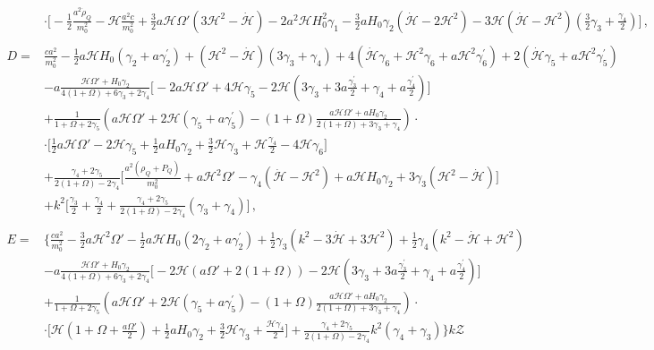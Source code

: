 \documentclass[prd,nofootinbib,showpacs]{revtex4}
\def\l{\left}
\def\r{\right}
\def\f{\frac}
\def\hub{{\mathcal H}}
\begin{document}
{\begin{align}
&\cdot\bigg[ -\f{1}{2}\f{a^2\dot{\rho}_Q}{m_0^2} -\hub\f{a^2c}{m_0^2} +\f{3}{2}a\hub\Omega'\l(3\hub^2 -\dot{\hub}\r) -2a^2\hub H_0^2\gamma_1 -\f{3}{2}aH_0\gamma_2\l(\dot{\hub}-2\hub^2\r) -3\hub\l(\dot{\hub}-\hub^2\r)\l(\f{3}{2}\gamma_3 + \f{\gamma_4}{2}\r)\bigg] \, ,\nonumber\\
%
& \nonumber \\
%
D =& \f{ca^2}{m_0^2}-\f{1}{2}a\hub H_0\l( \gamma_2+a\gamma_2^\prime\r) +\l(\hub^2-\dot{\hub}\r)\l(3\gamma_3+\gamma_4\r) +4\l( \dot{\hub}\gamma_6+\hub^2\gamma_6 +a\hub^2\gamma_6^\prime\r) +2\l(\dot{\hub}\gamma_5+a\hub^2\gamma_5^\prime \r) \nonumber\\
& -a\f{\hub \Omega' + H_0\gamma_2}{4(1+\Omega)+6\gamma_3+2\gamma_4}\bigg[ -2a\hub\Omega' +4\hub\gamma_5 -2\hub\l(3\gamma_3+3a\f{\gamma_3^\prime}{2}+ \gamma_4 +a\f{\gamma_4^\prime}{2} \r)\bigg] \nonumber\\
& +\f{1}{1+\Omega+2\gamma_5}\l( a\hub\Omega' +2\hub\l(\gamma_5+a\gamma_5^\prime\r) -(1+\Omega)\f{a\hub\Omega' +aH_0\gamma_2}{2(1+\Omega) +3\gamma_3+\gamma_4}\r)\cdot \nonumber\\
& \cdot \bigg[ \f{1}{2}a\hub \Omega' -2\hub\gamma_5+\f{1}{2}aH_0 \gamma_2+\f{3}{2}\hub \gamma_3 +\hub\f{\gamma_4}{2} -4\hub \gamma_6 \bigg] \nonumber \\
& +\f{\gamma_4 +2\gamma_5}{2(1+\Omega) -2\gamma_4}\bigg[\f{a^2\l(\rho_Q+ P_Q \r)}{m_0^2} +a\hub^2\Omega' -\gamma_4\l(\dot{\hub}-\hub^2\r) +a\hub H_0\gamma_2+3\gamma_3\l(\hub^2 -\dot{\hub} \r)\bigg] \nonumber \\
& +k^2\bigg[\f{\gamma_3}{2} +\f{\gamma_4}{2} +\f{\gamma_4 +2\gamma_5}{2(1+\Omega)-2\gamma_4}\l(\gamma_3+\gamma_4 \r) \bigg] \, ,\nonumber \\
%
& \nonumber \\
%
E =& \bigg\{ \f{ca^2}{m_0^2} -\f{3}{2}a\hub^2\Omega' -\f{1}{2}a\hub H_0\l(2\gamma_2+a\gamma_2^\prime\r) +\f{1}{2}\gamma_3\l(k^2 -3\dot{\hub} + 3\hub^2\r) +\f{1}{2}\gamma_4\l(k^2 -\dot{\hub} +\hub^2 \r) \nonumber \\
& -a\f{\hub \Omega' + H_0\gamma_2}{4(1+\Omega)+6\gamma_3+2\gamma_4}\bigg[ -2\hub\l(a\Omega' +2(1+\Omega)\r) -2\hub\l(3\gamma_3 +3 a\f{\gamma_3^\prime}{2} +\gamma_4 +a\f{\gamma_4^\prime}{2}\r) \bigg] \nonumber \\
& +\f{1}{1+\Omega+2\gamma_5}\l( a\hub\Omega' +2\hub\l(\gamma_5+a\gamma_5^\prime\r) -(1+\Omega)\f{a\hub\Omega' +aH_0\gamma_2}{2(1+\Omega) +3\gamma_3+\gamma_4}\r)\cdot \nonumber\\
&\cdot \bigg[ \hub\l(1+\Omega +\f{a\Omega'}{2}\r) +\f{1}{2}aH_0\gamma_2+\f{3}{2}\hub\gamma_3+\f{\hub\gamma_4}{2} \bigg] +\f{\gamma_4 +2\gamma_5}{2(1+\Omega) -2\gamma_4}k^2\l(\gamma_4 +\gamma_3\r) \bigg\} k\mathcal{Z} \nonumber \\

\end{align}}
\end{document}
